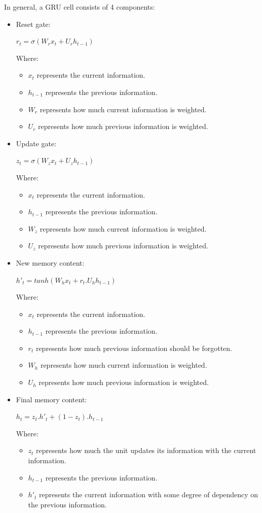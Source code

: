 \documentclass{ieeeojies}
\begin{document}
In general, a GRU cell consists of 4 components:
\begin{itemize}
	\item Reset gate:
	\newline \centerline{$r_{t} = \sigma(W_{r}x_{t} + U_{r}h_{t-1})$}
	\newline Where:
	\begin{itemize}
		\item $x_{t}$ represents the current information.
		\item $h_{t-1}$ represents the previous information.
		\item $W_{r}$ represents how much current information is weighted.
		\item $U_{r}$ represents how much previous information is weighted.
	\end{itemize}
	\item Update gate:
	\newline \centerline{$z_{t} = \sigma(W_{z}x_{t} + U_{z}h_{t-1})$}
	\newline Where:
	\begin{itemize}
		\item $x_{t}$ represents the current information.
		\item $h_{t-1}$ represents the previous information.
		\item $W_{z}$ represents how much current information is weighted.
		\item $U_{z}$ represents how much previous information is weighted.
	\end{itemize}
	\item New memory content:
	\newline \centerline{$h'_{t} =  tanh(W_{h}x_{t} + r_{t}.U_{h}h_{t-1})$}
	\newline Where:
	\begin{itemize}
		\item $x_{t}$ represents the current information.
		\item $h_{t-1}$ represents the previous information.
		\item $r_{t}$ represents how much previous information should be forgotten.
		\item $W_{h}$ represents how much current information is weighted.
		\item $U_{h}$ represents how much previous information is weighted.
	\end{itemize}
	\item Final memory content:
	\newline \centerline{$h_{t} =  z_{t}.h'_{t} + (1 - z_{t}).h_{t-1}$}
	\newline Where:
	\begin{itemize}
		\item $z_{t}$ represents how much the unit updates its information with the current information.
		\item $h_{t-1}$ represents the previous information.
		\item $h'_{t}$ represents the current information with some degree of dependency on the previous information.
	\end{itemize}
\end{itemize}
\end{document}
